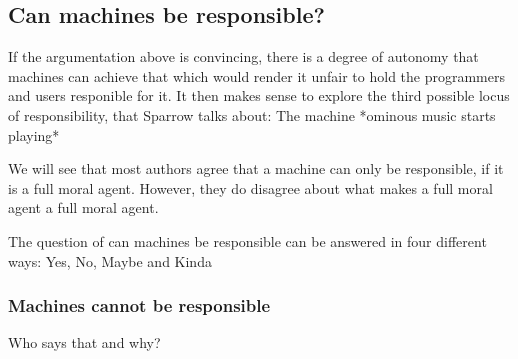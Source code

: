 \documentclass{article}
\begin{document}
\subsection{Can machines be responsible?}

If the argumentation above is convincing, there is a degree of autonomy that
machines can achieve that which would render it unfair to hold the programmers and users
responible for it. It then makes sense to explore the third possible locus of
responsibility, that Sparrow talks about: The machine *ominous music starts
playing*

We will see that most authors agree that a machine can only be responsible, if
it is a full moral agent. However, they do disagree about what makes a full
moral agent a full moral agent.

The question of can machines be responsible can be answered in four different
ways: Yes, No, Maybe and Kinda
\newpage

\subsubsection{Machines cannot be responsible}
Who says that and why?
\end{document}
